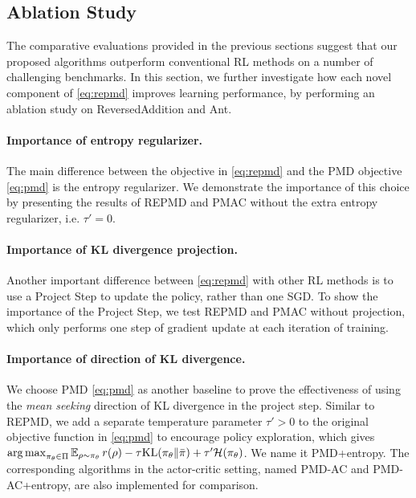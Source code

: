 
\subsection{Ablation Study}
\label{subsec:ablationstudy}

The comparative evaluations provided in the previous sections suggest 
that our proposed algorithms 
outperform conventional RL methods on a number of challenging benchmarks.
In this section, we further investigate how each novel component of
\cref{eq:repmd} improves learning performance,
by performing an ablation study on ReversedAddition and Ant.


\paragraph{Importance of entropy regularizer.} The main difference between the objective in \cref{eq:repmd} and the PMD
objective \cref{eq:pmd} is the entropy regularizer.
We demonstrate the importance of this choice by presenting the results of REPMD and PMAC without the extra entropy regularizer, i.e. $\tau'=0$.

\paragraph{Importance of KL divergence projection.} Another important difference between \cref{eq:repmd} with other RL methods
is to use a Project Step to update the policy,
rather than one SGD.
To show the importance of the Project Step,
we test REPMD and PMAC without projection,
which only performs one step of gradient update at each iteration of training. 

\paragraph{Importance of direction of KL divergence.} We choose PMD \cref{eq:pmd} as another baseline
to prove the effectiveness of using the \emph{mean seeking}
direction of KL divergence in the project step.
Similar to REPMD, we add a separate temperature parameter $\tau' > 0$
to the original objective function in \cref{eq:pmd}
to encourage policy exploration,
which gives
$\operatorname*{arg\,max}_{\pi_\theta \in \Pi}{ \operatorname*{\mathbb{E}}_{\rho \sim \pi_\theta}{  r(\rho)  - \tau \text{KL}(\pi_\theta \| \bar{\pi}) } + \tau'\mathcal{H}(\pi_\theta) }$.
We name it PMD+entropy.
The corresponding algorithms in the actor-critic setting,
named PMD-AC and PMD-AC+entropy, are also implemented for comparison.

